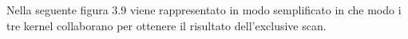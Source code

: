\documentclass[12pt,a4paper]{report}
\begin{document}
Nella seguente figura 3.9 viene rappresentato in modo semplificato in che modo i tre kernel collaborano per ottenere il risultato dell'exclusive scan.
\begin{figure}[H]
\centering
\begin{floatrow}[1]
\end{floatrow}
\end{figure} 


\end{document}
